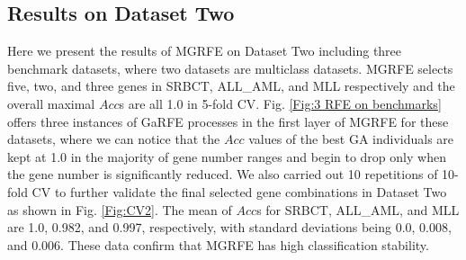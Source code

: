\documentclass[10pt,journal,compsoc]{IEEEtran}
\begin{document}
	\subsection{Results on Dataset Two}
	
	Here we present the results of MGRFE on Dataset Two including three benchmark datasets, where two datasets are multiclass datasets. MGRFE selects five, two, and three genes in SRBCT, ALL\_AML, and MLL respectively and the overall maximal \(Acc\)s are all 1.0 in 5-fold CV. Fig. \ref{Fig:3 RFE on benchmarks} offers three instances of GaRFE processes in the first layer of MGRFE for these datasets, where we can notice that the \(Acc\) values of the best GA individuals are kept at 1.0 in the majority of gene number ranges and begin to drop only when the gene number is significantly reduced. We also carried out 10 repetitions of 10-fold CV to further validate the final selected gene combinations in Dataset Two as shown in Fig. \ref{Fig:CV2}. The mean of \(Acc\)s for SRBCT, ALL\_AML, and MLL are 1.0, 0.982, and 0.997, respectively, with standard deviations being 0.0, 0.008, and 0.006. These data confirm that MGRFE has high classification stability.
	
\end{document}
